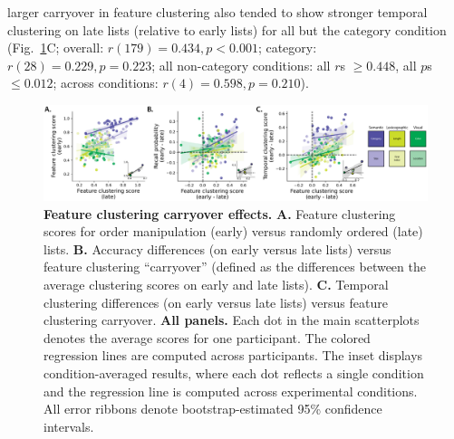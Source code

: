 \documentclass[11pt]{article}
\begin{document}
larger carryover in feature clustering also tended to show stronger temporal
clustering on late lists (relative to early lists) for all but the category
condition (Fig.~\ref{fig:clustering-carryover}C; overall: $r(179) = 0.434, p <
0.001$; category: $r(28) = 0.229, p = 0.223$; all non-category conditions: all
$r$s $\geq 0.448$, all $p$s $\leq 0.012$; across conditions: $r(4) = 0.598, p =
0.210$).

\begin{figure}[tp] \centering
    \includegraphics[width=\textwidth]{figures/clustering_carryover}

    \caption{\textbf{Feature clustering carryover effects.} \textbf{A.} Feature
    clustering scores for order manipulation (early) versus randomly ordered
    (late) lists. \textbf{B.} Accuracy differences (on early versus late lists)
    versus feature clustering ``carryover'' (defined as the differences between
    the average clustering scores on early and late lists). \textbf{C.}
    Temporal clustering differences (on early versus late lists) versus feature
    clustering carryover. \textbf{All panels.} Each dot in the main
    scatterplots denotes the average scores for one participant. The colored
    regression lines are computed across participants. The inset displays
    condition-averaged results, where each dot reflects a single condition and
    the regression line is computed across experimental conditions. All error
    ribbons denote bootstrap-estimated 95\% confidence intervals.}
    \label{fig:clustering-carryover} 

\end{figure}
\end{document}
